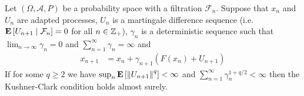\begin{prop}\label{AlmostSureKushnerClarkBoundedMoments}Let $(\Omega, \mathcal{A}, P)$ be a probability space with a filtration $\mathcal{F}_n$.  Suppose that $x_n$ and $U_n$ are adapted processes, $U_n$ is a martingale difference sequence (i.e. $\cexpectationlong{\mathcal{F}_n}{U_{n+1}}=0$ for all $n \in \integers_+$), $\gamma_n$ is a deterministic sequence such that $\lim_{n \to \infty} \gamma_n = 0$ and $\sum_{n=1}^\infty \gamma_n = \infty$ and 
\begin{align*}
x_{n+1} &= x_n + \gamma_{n+1} (F(x_n) + U_{n+1})
\end{align*}
If for some $q \geq 2$ we have $\sup_n \expectation{\norm{U_{n+1}}^q} < \infty$ and $\sum_{n=1}^\infty \gamma_n^{1+q/2} < \infty$ then the Kushner-Clark condition holds almost surely.
\end{prop}
